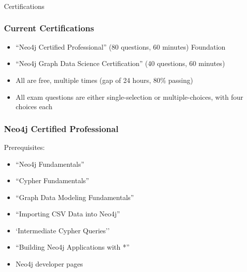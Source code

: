 \begin{frame}[fragile]\frametitle{}
\begin{center}
{\Large Certifications}
\end{center}
\end{frame}

\begin{frame}\frametitle{Current Certifications}
\begin{itemize}
\item  ``Neo4j Certified Professional'' (80 questions, 60 minutes) Foundation
\item ``Neo4j Graph Data Science Certification'' (40 questions, 60 minutes)
\end{itemize}


\begin{itemize}
\item All are free, multiple times (gap of 24 hours, 80\% passing)
\item All exam questions are either single-selection or multiple-choices, with four choices each
\end{itemize}

\end{frame}

\begin{frame}\frametitle{Neo4j Certified Professional}
Prerequisites:

\begin{itemize}
\item ``Neo4j Fundamentals''
\item ``Cypher Fundamentals''
\item ``Graph Data Modeling Fundamentals''
\item ``Importing CSV Data into Neo4j''
\item `Intermediate Cypher Queries''
\item ``Building Neo4j Applications with *''
\item Neo4j developer pages
\end{itemize}
\end{frame}




